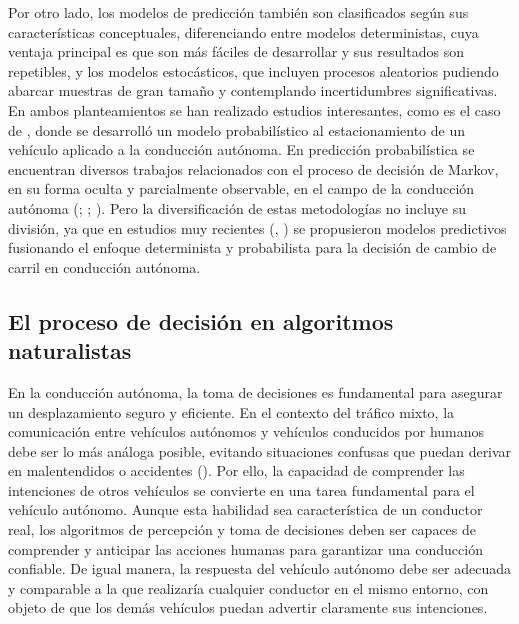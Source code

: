 Por otro lado, los modelos de predicción también son clasificados según sus características conceptuales, diferenciando entre modelos deterministas, cuya ventaja principal es que son más fáciles de desarrollar y sus resultados son repetibles, y los modelos estocásticos, que incluyen  procesos aleatorios pudiendo abarcar muestras de gran tamaño y contemplando incertidumbres significativas. En ambos planteamientos se han realizado estudios interesantes, como es el caso de \textcite{vanbrummelen}, donde se desarrolló un modelo probabilístico al estacionamiento de un vehículo aplicado a la conducción autónoma. En predicción probabilística se encuentran diversos trabajos relacionados con el proceso de decisión de Markov, en su forma oculta y parcialmente observable, en el campo de la conducción autónoma (\cite{guan}; \cite{park}; \cite{li21a}). Pero la diversificación de estas metodologías no incluye su división, ya que en estudios muy recientes (\cite{suh}, \cite{luo}) se propusieron modelos predictivos fusionando el enfoque determinista y probabilista para la decisión de cambio de carril en conducción autónoma.

\subsection{El proceso de decisión en algoritmos naturalistas}

En la conducción autónoma, la toma de decisiones es fundamental para asegurar un desplazamiento seguro y eficiente. En el contexto del tráfico mixto, la comunicación entre vehículos autónomos y vehículos conducidos por humanos debe ser lo más análoga posible, evitando situaciones confusas que puedan derivar en malentendidos o accidentes (\cite{jenssen}). Por ello, la capacidad de comprender las intenciones de otros vehículos se convierte en una tarea fundamental para el vehículo autónomo. Aunque esta habilidad sea característica de un conductor real, los algoritmos de percepción y toma de decisiones deben ser capaces de comprender y anticipar las acciones humanas para garantizar una conducción confiable. De igual manera, la respuesta del vehículo autónomo debe ser adecuada y comparable a la que realizaría cualquier conductor en el mismo entorno, con objeto de que los demás vehículos puedan advertir claramente sus intenciones. 

